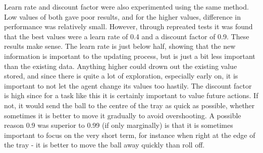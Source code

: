 \documentclass[12pt,a4paper]{article}
\begin{document}
Learn rate and discount factor were also experimented using the same method. Low values of both gave poor results, and for the higher values, difference in performance was relatively small. However, through repreated tests it was found that the best values were a learn rate of 0.4 and a discount factor of 0.9. These results make sense. The learn rate is just below half, showing that the new information is important to the updating process, but is just a bit less important than the existing data. Anything higher could drown out the existing value stored, and since there is quite a lot of exploration, especially early on, it is important to not let the agent change its values too hastily. The discount factor is high since for a task like this it is certainly important to value future actions. If not, it would send the ball to the centre of the tray as quick as possible, whether sometimes it is better to move it gradually to avoid overshooting. A possible reason 0.9 was superior to 0.99 (if only marginally) is that it is sometimes important to focus on the very short term, for instance when right at the edge of the tray - it is better to move the ball away quickly than roll off.
\end{document}
